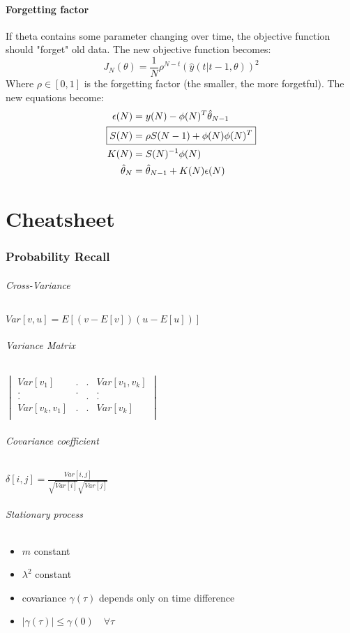 \documentclass{article}
\let\OldPart\part
\renewcommand{\part}{\newpage\OldPart}
\begin{document}
\subsection{Forgetting factor}
If theta contains some parameter changing over time, the objective function should "forget" old data. The new objective function becomes:
\[
J_N(\theta)=\frac{1}{N}
\rho^{N-t}\left(\hat{y}(t|t-1,\theta)\right)^2
\]
Where $\rho\in\left[0,1\right]$ is the forgetting factor (the smaller, the more forgetful). The new equations become:
\begin{align*}
\epsilon(N)&=y(N)-\phi(N)^T\hat{\theta}_{N-1}\\
\Aboxed{
S(N)&=\rho S(N-1)+\phi(N)\phi(N)^T
}\\
K(N)&=S(N)^{-1}\phi(N)\\
\hat{\theta}_N&=\hat{\theta}_{N-1}+K(N)\epsilon(N)
\end{align*}

\newpage
\part{Cheatsheet}
\section{Probability Recall}
\paragraph{Cross-Variance}
$Var[v,u]=E[(v-E[v])(u-E[u])]$
\paragraph{Variance Matrix}
$\begin{vmatrix}
	Var[v_1]			&	.	&	.	&	Var[v_1,v_k]		\\
		.			&	.	&		&		.			\\
		.			&		&	.	&		.			\\
	Var[v_k,v_1]		&	.	&	.	&	Var[v_k]			\\
				
\end{vmatrix}$
\paragraph{Covariance coefficient}
	$\delta[i,j]=\frac{Var[i,j]}{\sqrt{Var[i]}\sqrt{Var[j]}}$
\paragraph{Stationary process}
\begin{itemize}
	\item $m$ constant
	\item $\lambda^2$ constant
	\item covariance $\gamma(\tau)$ depends only on time difference
	\item $|\gamma(\tau)|\leq\gamma(0)		\quad\forall\tau$
\end{itemize}
\end{document}
